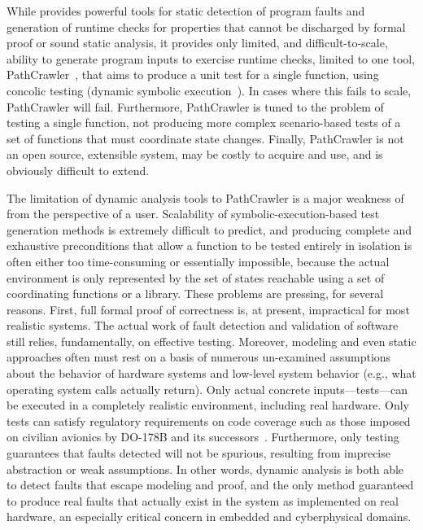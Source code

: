 While \framac{} provides powerful tools for static detection of program faults and generation of runtime checks for properties that cannot be discharged by formal proof or sound static analysis, it provides only limited, and difficult-to-scale, ability to generate program inputs to exercise runtime checks, limited to one tool, PathCrawler~\cite{WilliamsMMR05EDCC}, that aims to produce a unit test for a single function, using concolic testing (dynamic symbolic execution~\cite{GodefroidKS05}).  In cases where this fails to scale, PathCrawler will fail.  Furthermore, PathCrawler is tuned to the problem of testing a single function, not producing more complex scenario-based tests of a set of functions that must coordinate state changes.  Finally, PathCrawler is not an open source, extensible system, may be costly to acquire and use, and is obviously difficult to extend.

The limitation of dynamic analysis tools to PathCrawler is a major weakness of \framac from the perspective of a user.  Scalability of symbolic-execution-based test generation methods is extremely difficult to predict, and producing complete and exhaustive preconditions that allow a function to be tested entirely in isolation is often either too time-consuming or essentially impossible, because the actual environment is only represented by the set of states reachable using a set of coordinating functions or a library.  These problems are pressing, for several reasons.  First, full formal proof of correctness is, at present, impractical for most realistic systems.  The actual work of fault detection and validation of software still relies, fundamentally, on effective testing.  Moreover, modeling and even static approaches often must rest on a basis of numerous un-examined assumptions about the behavior of hardware systems and low-level system behavior (e.g., what operating system calls actually return).  Only actual concrete inputs---tests---can be executed in a completely realistic environment, including real hardware.  Only tests can satisfy regulatory requirements on code coverage such as those imposed on civilian avionics by DO-178B and its successors~\cite{MCDC}.  Furthermore, only testing guarantees that faults detected will not be spurious, resulting from imprecise abstraction or weak assumptions.  In other words, dynamic analysis is both able to detect faults that escape modeling and proof, and the only method guaranteed to produce real faults that actually exist in the system as implemented on real hardware, an especially critical concern in embedded and cyberphysical domains.

